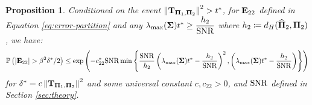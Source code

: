\documentclass[numsec,webpdf,modern,medium,namedate]{oup-authoring-template}
\theoremstyle{thmstyleone}%
\newtheorem{proposition}{Proposition}
\theoremstyle{thmstyletwo}%
\theoremstyle{thmstylethree}%
\begin{document}
\begin{proposition}\label{prop:E22-dist-cond-X}
    Conditioned on the event $\left\|\mathbf{T}_{\boldsymbol{\Pi}_1, \boldsymbol{\Pi}_2} \right\|^2 > t^\ast$, for $\mathbf{E}_{22}$ defined in Equation \ref{eq:error-partition} and any $ \lambda_{\max}(\boldsymbol{\Sigma}) t^\ast \geq \dfrac{h_2}{\mathrm{SNR}}$ where $h_2 \coloneq d_H(\widehat{\boldsymbol{\Pi}}_2,\boldsymbol{\Pi}_2)$, we have:
    {\footnotesize
    \begin{equation*}\label{eq:E22-dist-cond-X}
            \mathbb{P}\left(|\mathbf{E}_{22}| > \beta^2\delta^\ast/2\right)\leq  \exp \left(-c^\ast_{22}\mathrm{SNR} \min \left\{\frac{\mathrm{SNR}}{h_2}\left(\lambda_{\max}(\boldsymbol{\Sigma}) t^\ast - \dfrac{h_2}{\mathrm{SNR}}\right)^2,\left(\lambda_{\max}(\boldsymbol{\Sigma}) t^\ast - \dfrac{h_2}{\mathrm{SNR}}\right)\right\}\right)
    \end{equation*}}
    for $\delta^\ast = c\left\|\mathbf{T}_{\boldsymbol{\Pi}_1, \boldsymbol{\Pi}_2} \right\|^2$ and some universal constant $c,c_{22} > 0$, and $\mathrm{SNR}$ defined in Section \ref{sec:theory}.
\end{proposition}
\end{document}
